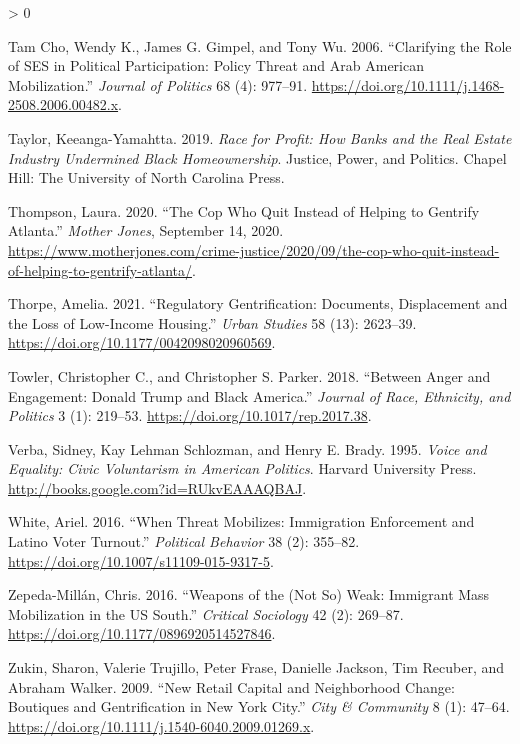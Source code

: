 \documentclass[
  12pt,
]{article}
\newlength{\cslhangindent}
\newenvironment{CSLReferences}[2] %
 {%
  \setlength{\parindent}{0pt}
  \ifodd #1 \everypar{\setlength{\hangindent}{\cslhangindent}}\ignorespaces\fi
  \ifnum #2 > 0
  \setlength{\parskip}{#2\baselineskip}
  \fi
 }%
 {}
\begin{document}
\begin{CSLReferences}{1}{0}
\leavevmode\hypertarget{ref-TamCho2006a}{}%
Tam Cho, Wendy K., James G. Gimpel, and Tony Wu. 2006. {``Clarifying the {Role} of {SES} in {Political Participation}: {Policy Threat} and {Arab American Mobilization}.''} \emph{Journal of Politics} 68 (4): 977--91. \url{https://doi.org/10.1111/j.1468-2508.2006.00482.x}.

\leavevmode\hypertarget{ref-Taylor2019}{}%
Taylor, Keeanga-Yamahtta. 2019. \emph{Race for Profit: How Banks and the Real Estate Industry Undermined Black Homeownership}. Justice, Power, and Politics. {Chapel Hill}: {The University of North Carolina Press}.

\leavevmode\hypertarget{ref-Thompson2020}{}%
Thompson, Laura. 2020. {``The Cop Who Quit Instead of Helping to Gentrify {Atlanta}.''} \emph{Mother Jones}, September 14, 2020. \url{https://www.motherjones.com/crime-justice/2020/09/the-cop-who-quit-instead-of-helping-to-gentrify-atlanta/}.

\leavevmode\hypertarget{ref-Thorpe2021}{}%
Thorpe, Amelia. 2021. {``Regulatory Gentrification: {Documents}, Displacement and the Loss of Low-Income Housing.''} \emph{Urban Studies} 58 (13): 2623--39. \url{https://doi.org/10.1177/0042098020960569}.

\leavevmode\hypertarget{ref-Towler2018}{}%
Towler, Christopher C., and Christopher S. Parker. 2018. {``Between {Anger} and {Engagement}: {Donald Trump} and {Black America}.''} \emph{Journal of Race, Ethnicity, and Politics} 3 (1): 219--53. \url{https://doi.org/10.1017/rep.2017.38}.

\leavevmode\hypertarget{ref-Verba1995}{}%
Verba, Sidney, Kay Lehman Schlozman, and Henry E. Brady. 1995. \emph{Voice and {Equality}: {Civic Voluntarism} in {American Politics}}. {Harvard University Press}. \url{http://books.google.com?id=RUkvEAAAQBAJ}.

\leavevmode\hypertarget{ref-White2016}{}%
White, Ariel. 2016. {``When {Threat Mobilizes}: {Immigration Enforcement} and {Latino Voter Turnout}.''} \emph{Political Behavior} 38 (2): 355--82. \url{https://doi.org/10.1007/s11109-015-9317-5}.

\leavevmode\hypertarget{ref-Zepeda-Millan2016}{}%
Zepeda-Millán, Chris. 2016. {``Weapons of the ({Not So}) {Weak}: {Immigrant Mass Mobilization} in the {US South}.''} \emph{Critical Sociology} 42 (2): 269--87. \url{https://doi.org/10.1177/0896920514527846}.

\leavevmode\hypertarget{ref-Zukin2009}{}%
Zukin, Sharon, Valerie Trujillo, Peter Frase, Danielle Jackson, Tim Recuber, and Abraham Walker. 2009. {``New {Retail Capital} and {Neighborhood Change}: {Boutiques} and {Gentrification} in {New York City}.''} \emph{City \& Community} 8 (1): 47--64. \url{https://doi.org/10.1111/j.1540-6040.2009.01269.x}.

\end{CSLReferences}
\end{document}
